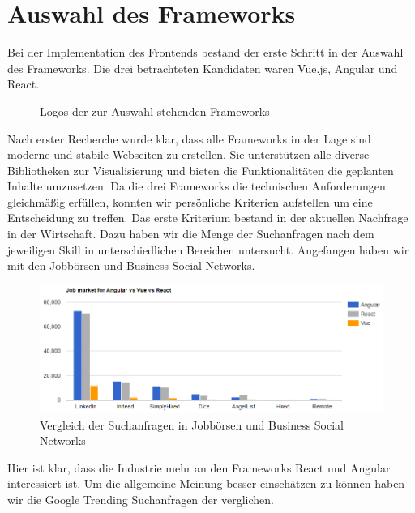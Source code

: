\section{Auswahl des Frameworks}%
Bei der Implementation des Frontends bestand der erste Schritt in der Auswahl des Frameworks. Die drei betrachteten Kandidaten waren Vue.js, Angular und React.

\begin{figure}[hbt!]%
  \centering
  \qquad
  \qquad
  \caption{Logos der zur Auswahl stehenden Frameworks}%
\end{figure}

Nach erster Recherche wurde klar, dass alle Frameworks in der Lage sind moderne und stabile Webseiten zu erstellen. Sie unterstützen alle diverse Bibliotheken zur Visualisierung und bieten die Funktionalitäten die geplanten Inhalte umzusetzen. Da die drei Frameworks die technischen Anforderungen gleichmäßig erfüllen, konnten wir persönliche Kriterien aufstellen um eine Entscheidung zu treffen. 
Das erste Kriterium bestand in der aktuellen Nachfrage in der Wirtschaft. Dazu haben wir die Menge der Suchanfragen nach dem jeweiligen Skill in unterschiedlichen Bereichen untersucht. Angefangen haben wir mit den Jobbörsen und Business Social Networks.

\begin{figure}[hbt!]%
  \centering
  \includegraphics[width=14cm]{images/08-Benutzeroberfläche/08-jobbörsen-anfragen.PNG}
  \caption{Vergleich der Suchanfragen in Jobbörsen und Business Social Networks}%
\end{figure}

Hier ist klar, dass die Industrie mehr an den Frameworks React und Angular interessiert ist. Um die allgemeine Meinung besser einschätzen zu können haben wir die Google Trending Suchanfragen der verglichen. 


